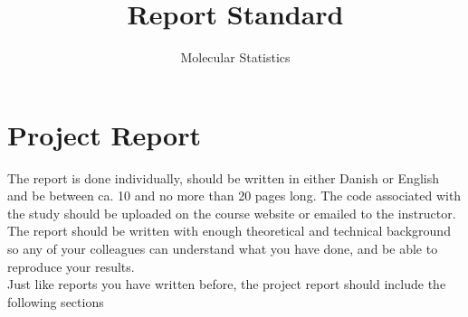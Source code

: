 \documentclass{article}
\title{Report Standard}
\author{Molecular Statistics}
\date{}
\begin{document}


\maketitle

\section*{Project Report}

The report is done individually, should be written in either Danish or English and be between ca. 10 and no more than 20 pages long.
The code associated with the study should be uploaded on the course website or emailed to the instructor.\\

The report should be written with enough theoretical and technical background so any of your colleagues can understand what you have done, and be able to reproduce your results.\\

Just like reports you have written before, the project report should include the following sections
\end{document}
